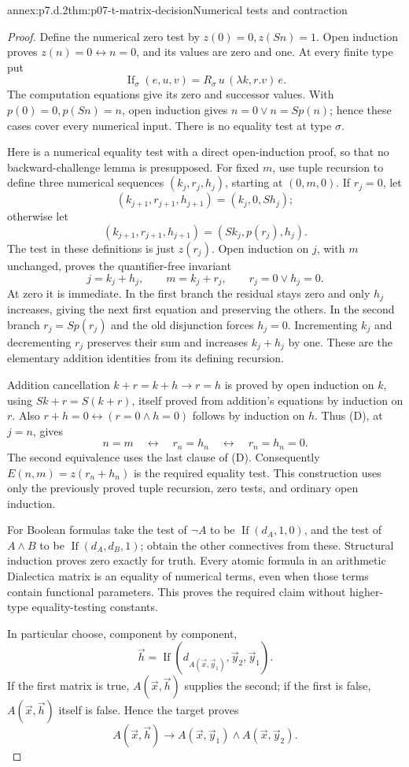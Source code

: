 \begin{annexitem}{annex:p7.d.2}{thm:p07-t-matrix-decision}{Numerical tests and contraction}
\begin{proof}
Define the numerical zero test by \(z(0)=0,z(Sn)=1\). Open induction
proves \(z(n)=0\leftrightarrow n=0\), and its values are zero and
one. At every finite type put
\[
 \operatorname{If}_\sigma(e,u,v)
   =R_\sigma\,u\,(\lambda k,r.v)\,e.
\]
The computation equations give its zero and successor values. With
\(p(0)=0,p(Sn)=n\), open induction gives
\(n=0\lor n=Sp(n)\); hence these cases cover every numerical input.
There is no equality test at type \(\sigma\).

Here is a numerical equality test with a direct open-induction proof,
so that no backward-challenge lemma is presupposed. For fixed \(m\),
use tuple recursion to define three numerical sequences
\((k_j,r_j,h_j)\), starting at \((0,m,0)\). If \(r_j=0\), let
\[
 (k_{j+1},r_{j+1},h_{j+1})=(k_j,0,Sh_j);
\]
otherwise let
\[
 (k_{j+1},r_{j+1},h_{j+1})=(Sk_j,p(r_j),h_j).
\]
The test in these definitions is just \(z(r_j)\). Open induction on
\(j\), with \(m\) unchanged, proves the quantifier-free invariant
\[
 j=k_j+h_j,\qquad m=k_j+r_j,\qquad r_j=0\lor h_j=0.
 \tag{D}
\]
At zero it is immediate. In the first branch the residual stays zero
and only \(h_j\) increases, giving the next first equation and
preserving the others. In the second branch
\(r_j=Sp(r_j)\) and the old disjunction forces \(h_j=0\).
Incrementing \(k_j\) and decrementing \(r_j\) preserves their sum
and increases \(k_j+h_j\) by one. These are the elementary addition
identities from its defining recursion.

Addition cancellation \(k+r=k+h\to r=h\) is proved by open
induction on \(k\), using \(Sk+r=S(k+r)\), itself proved from
addition's equations by induction on \(r\). Also
\(r+h=0\leftrightarrow(r=0\land h=0)\) follows by induction on
\(h\). Thus (D), at \(j=n\), gives
\[
 n=m\quad\longleftrightarrow\quad r_n=h_n
 \quad\longleftrightarrow\quad r_n=h_n=0.
\]
The second equivalence uses the last clause of (D). Consequently
\(E(n,m)=z(r_n+h_n)\) is the required equality test.
This construction uses only the previously proved tuple recursion,
zero tests, and ordinary open induction.

For Boolean formulas take the test of \(\neg A\) to be
\(\operatorname{If}(d_A,1,0)\), and the test of \(A\land B\)
to be \(\operatorname{If}(d_A,d_B,1)\); obtain the other
connectives from these. Structural induction proves zero exactly for
truth. Every atomic formula in an arithmetic Dialectica matrix is an
equality of numerical terms, even when those terms contain functional
parameters. This proves the required claim without higher-type
equality-testing constants.

In particular choose, component by component,
\[
 \vec h=\operatorname{If}(d_{A(\vec x,\vec y_1)},
                           \vec y_2,\vec y_1).
\]
If the first matrix is true, \(A(\vec x,\vec h)\) supplies the
second; if the first is false, \(A(\vec x,\vec h)\) itself is false.
Hence the target proves
\[
 A(\vec x,\vec h)\longrightarrow
 A(\vec x,\vec y_1)\land A(\vec x,\vec y_2).
\]
\end{proof}
\end{annexitem}

